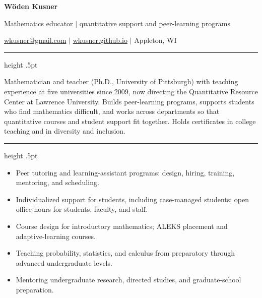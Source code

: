 \documentclass[11pt]{article}
\newcommand{\sect}[1]{\par\vspace{7pt}{\large\bfseries #1}\par\vspace{1pt}%
  {\color{rule}\hrule height .5pt}\vspace{4pt}}
\begin{document}
{\LARGE\bfseries W\"oden Kusner}\par\vspace{2pt}
Mathematics educator $|$ quantitative support and peer-learning programs\par\vspace{2pt}
\href{mailto:wkusner@gmail.com}{wkusner@gmail.com} $|$
\href{https://wkusner.github.io}{wkusner.github.io} $|$
Appleton, WI

\sect{Summary}
Mathematician and teacher (Ph.D., University of Pittsburgh) with teaching experience at five universities since
2009, now directing the Quantitative Resource Center at Lawrence University. Builds peer-learning programs,
supports students who find mathematics difficult, and works across departments so that quantitative courses
and student support fit together. Holds certificates in college teaching and in diversity and inclusion.

\sect{Areas of Strength}
\begin{itemize}
  \item Peer tutoring and learning-assistant programs: design, hiring, training, mentoring, and scheduling.
  \item Individualized support for students, including case-managed students; open office hours for
        students, faculty, and staff.
  \item Course design for introductory mathematics; ALEKS placement and adaptive-learning courses.
  \item Teaching probability, statistics, and calculus from preparatory through advanced undergraduate levels.
  \item Mentoring undergraduate research, directed studies, and graduate-school preparation.
\end{itemize}
\end{document}
